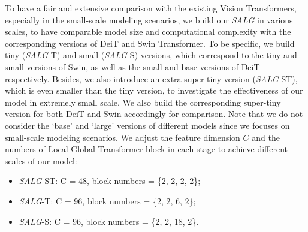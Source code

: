 To have a fair and extensive comparison with the existing Vision Transformers, especially in the small-scale modeling scenarios, we build our \emph{SALG} in various scales, to have comparable model size and computational complexity with the corresponding versions of DeiT and Swin Transformer. To be specific, we build tiny (\emph{SALG}-T) and small (\emph{SALG}-S) versions, which correspond to the tiny and small versions of Swin, as well as the small and base versions of DeiT respectively. Besides, we also introduce an extra super-tiny version (\emph{SALG}-ST), which is even smaller than the tiny version, to investigate the effectiveness of our model in extremely small scale. We also build the corresponding super-tiny version for both DeiT and Swin accordingly for comparison. Note that we do not consider the `base' and `large' versions of different models since we focuses on small-scale modeling scenarios. We adjust the feature dimension $C$ and the numbers of Local-Global Transformer block in each stage to achieve different scales of our model:
\begin{itemize}
    \item \emph{SALG}-ST: C = 48, block numbers = \{2, 2, 2, 2\};
    \item \emph{SALG}-T: C = 96, block numbers = \{2, 2, 6, 2\};
    \item \emph{SALG}-S: C = 96, block numbers = \{2, 2, 18, 2\}.
\end{itemize}

